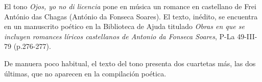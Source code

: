
El tono \textit{Ojos, yo no di licencia} pone en música un romance en castellano de Frei António das Chagas (António da Fonseca Soares). El texto, inédito, se encuentra en un manuscrito poético en la Biblioteca de Ajuda titulado \textit{Obras en que se incluyen romances líricos castellanos de Antonio da Fonseca Soares}, P-La 49-III-79 (p.276-277).

De manuera poco habitual, el texto del tono presenta dos cuartetas más, las dos últimas, que no aparecen en la compilación poética.
